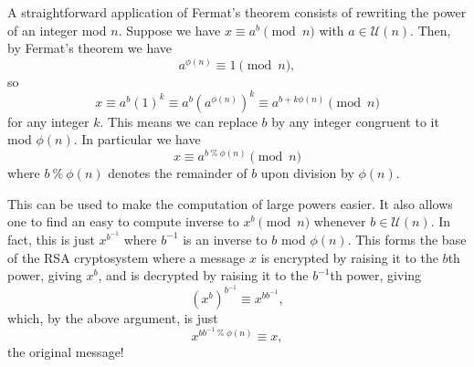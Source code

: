\documentclass[12pt]{article}
\newcommand{\remainder}{\: \% \:}
\begin{document}
A straightforward application of Fermat's theorem consists of rewriting the power of an integer mod $n$. Suppose we have $x \equiv a^b \pmod{n}$ with $a \in \mathcal{U}(n)$. Then, by Fermat's theorem we have
\begin{equation*}
a^{\phi(n)}\equiv 1 \pmod{n},
\end{equation*}
so
\begin{equation*}
x \equiv a^b (1)^k \equiv a^b (a^{\phi(n)})^k \equiv a^{b+k\phi(n)} \pmod{n}
\end{equation*}
for any integer $k$. This means we can replace $b$ by any integer congruent to it mod $\phi(n)$. In particular we have
\begin{equation*}
x \equiv a^{b \remainder \phi(n)} \pmod{n}
\end{equation*}
 where $b \remainder \phi(n)$ denotes the remainder of $b$ upon division by $\phi(n)$.

This can be used to make the computation of large powers easier. It also allows one to find an easy to compute inverse to $x^b \pmod{n}$ whenever $b \in \mathcal{U}(n)$. In fact, this is just $x^{b^{-1}}$ where $b^{-1}$ is an inverse to $b$ mod $\phi(n)$. This forms the base of the RSA cryptosystem where a message $x$ is encrypted by raising it to the $b$th power, giving $x^b$, and is decrypted by raising it to the $b^{-1}$th power, giving 
\begin{equation*}
(x^b)^{b^{-1}} \equiv x^{b b^{-1}},
\end{equation*}
which, by the above argument, is just
\begin{equation*}
x^{ b b^{-1} \remainder \phi(n)} \equiv x,
\end{equation*}
the original message!
\end{document}
